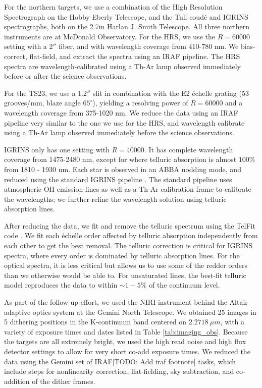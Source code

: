 \documentclass{emulateapj}
\begin{document}
For the northern targets, we use a combination of the High Resolution Spectrograph \citep[HRS,][]{HRS} on the Hobby Eberly Telescope, and the Tull coud\'e \citep[TS23,][]{TS23} and IGRINS \citep{IGRINS} spectrographs, both on the 2.7m Harlan J. Smith Telescope. All three northern instruments are at McDonald Observatory. For the HRS, we use the $R = 60000$ setting with a $2''$ fiber, and with wavelength coverage from 410-780 nm. We bias-correct, flat-field, and extract the spectra using an IRAF pipeline. The HRS spectra are wavelength-calibrated using a Th-Ar lamp observed immediately before or after the science observations.

For the TS23, we use a $1.2''$ slit in combination with the E2 \'echelle grating (53 grooves/mm, blaze angle $65^{\circ}$), yielding a resolving power of $R=60000$ and a wavelength coverage from 375-1020 nm. We reduce the data using an IRAF pipeline very similar to the one we use for the HRS, and wavelength calibrate using a Th-Ar lamp observed immediately before the science observations.

IGRINS only has one setting with $R = 40000$. It has complete wavelength coverage from 1475-2480 nm, except for where telluric absorption is almost $100\%$ from 1810 - 1930 nm. Each star is observed in an ABBA nodding mode, and reduced using the standard IGRINS pipeline \citep{IGRINS_plp_v2}. The standard pipeline uses atmospheric OH emission lines as well as a Th-Ar calibration frame to calibrate the wavelengths; we further refine the wavelength solution using telluric absorption lines.

After reducing the data, we fit and remove the telluric spectrum using the TelFit code \citep{Gullikson2014}. We fit each \'echelle order affected by telluric absorption independently from each other to get the best removal. The telluric correction is critical for IGRINS spectra, where every order is dominated by telluric absorption lines. For the optical spectra, it is less critical but allows us to use some of the redder orders than we otherwise would be able to. For unsaturated lines, the best-fit telluric model reproduces the data to within $\sim 1-5\%$ of the continuum level.

As part of the follow-up effort, we used the NIRI instrument behind the Altair adaptive optics system at the Gemini North Telescope. We obtained 25 images in 5 dithering positions in the K-continuum band centered on $2.2718\ \mu m$, with a variety of exposure times and dates listed in Table \ref{tab:imaging_obs}. Because the targets are all extremely bright, we used the high read noise and high flux detector settings to allow for very short co-add exposure times. We reduced the data using the Gemini set of IRAF[TODO: Add iraf footnote] tasks, which include steps for nonlinearity correction, flat-fielding, sky subtraction, and co-addition of the dither frames.
\end{document}
